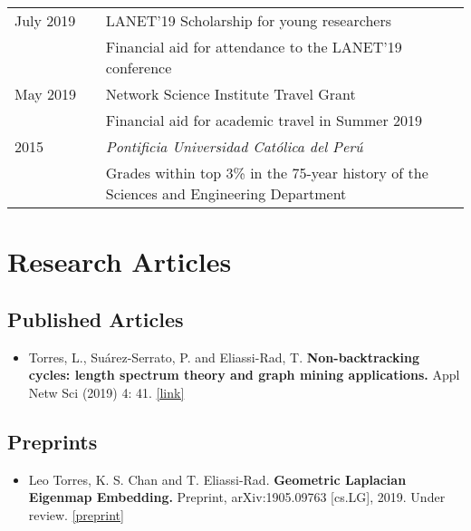 \documentclass[12pt,]{scrartcl}
\begin{document}
\begin{table}[!h]
{\def\arraystretch{1.5}\tabcolsep=0pt
\begin{tabular}{p{0.2\linewidth}p{0.8\linewidth}}

July 2019 & LANET'19 Scholarship for young researchers \\
& Financial aid for attendance to the LANET'19 conference \\

May 2019 & Network Science Institute Travel Grant \\
& Financial aid for academic travel in Summer 2019 \\

2015 & \textit{Pontificia Universidad Católica del Perú} \\
& Grades within top 3\% in the 75-year history of the Sciences and Engineering Department \\

\end{tabular}%
}
\end{table}


\newpage
\section{Research Articles}\label{publications}

\subsection{Published Articles}\label{articles}

\begin{itemize}
\leftskip-0.25in %

\item Torres, L., Su\'arez-Serrato, P. and Eliassi-Rad, T.  \textbf{Non-backtracking cycles: length spectrum theory and graph mining applications.}  Appl Netw Sci (2019) 4: 41. \href{https://doi.org/10.1007/s41109-019-0147-y}{[link]}

\end{itemize}


\subsection{Preprints}\label{preprints}

\begin{itemize}
\leftskip-0.25in %

\item Leo Torres, K. S. Chan and T. Eliassi-Rad. \textbf{Geometric Laplacian Eigenmap Embedding.} Preprint, arXiv:1905.09763 [cs.LG], 2019. Under review. \href{https://arxiv.org/abs/1905.09763}{[preprint]}

\end{itemize}
\end{document}

